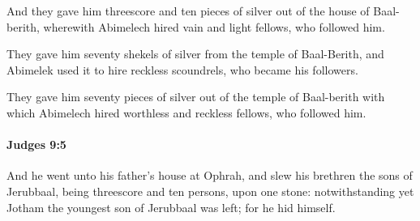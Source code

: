 			\begin{versebox}
					\item[BHS] 
					\item[ASV] And they gave him threescore and ten pieces of silver out of the house of Baal-berith, wherewith Abimelech hired vain and light fellows, who followed him.
					\item[NIV] They gave him seventy shekels of silver from the temple of Baal-Berith, and Abimelek used it to hire reckless scoundrels, who became his followers.
					\item[NRSV] They gave him seventy pieces of silver out of the temple of Baal-berith with which Abimelech hired worthless and reckless fellows, who followed him.
			\end{versebox}

		\paragraph{Judges 9:5} %
			\label{JUDGES-9-5}

			And he went unto his father’s house at Ophrah, and slew his brethren the sons of Jerubbaal, being threescore and ten persons, upon one stone: notwithstanding yet Jotham the youngest son of Jerubbaal was left; for he hid himself.

